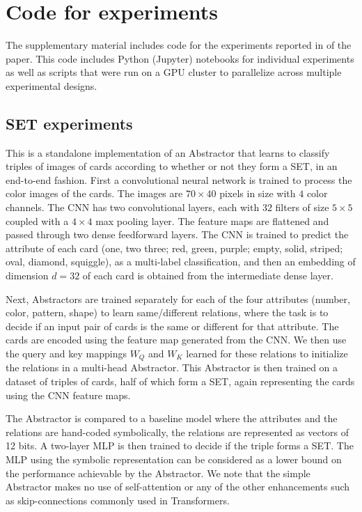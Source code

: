 \section{Code for experiments}
\label{sec:code}

The supplementary material includes code for the experiments reported in  of the paper. This code includes Python (Jupyter) notebooks for individual experiments as well as scripts that were run on a GPU cluster to parallelize across multiple experimental designs.


\setcounter{subsection}{4}
\subsection{SET experiments}

This is a standalone implementation of an Abstractor that learns to classify triples of images of cards according 
to whether or not they form a SET, in an end-to-end fashion. First a convolutional neural network is trained to process the color images of the cards. The images are $70 \times 40$ pixels in size with $4$ color channels. The CNN has two convolutional layers, each with $32$ filters of size $5\times 5$ coupled with a $4\times 4$ max pooling layer. The feature maps are flattened and passed through two dense feedforward layers. The CNN is trained to predict the attribute of each card (one, two three; red, green, purple; empty, solid, striped; oval, diamond, squiggle), as a multi-label classification, and then an embedding of dimension $d=32$ of each card is obtained from the intermediate dense layer. 

Next, Abstractors are trained separately for each of the four attributes (number, color, pattern, shape) to learn same/different relations, where the task is to decide if an input pair of cards is the same or different for that attribute. The cards are encoded using the feature map generated from the CNN. We then use the query and key mappings $W_Q$ and $W_K$ learned for these relations to initialize the relations in a multi-head Abstractor. This Abstractor is then trained on a dataset of triples of cards, half of which form a SET, again representing the cards using the CNN feature maps.

The Abstractor is compared to a baseline model where the attributes and the relations are hand-coded symbolically, the relations are represented as vectors of 12 bits. A two-layer MLP is then trained to decide if the triple forms a SET. The MLP using the symbolic representation can be considered as a lower bound on the performance achievable by the Abstractor. We note that the simple Abstractor makes no use of self-attention or any of the other enhancements such as skip-connections commonly used in Transformers.
